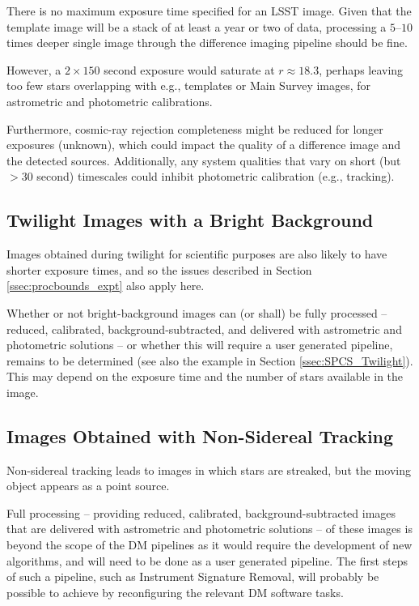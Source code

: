 There is no maximum exposure time specified for an LSST image.
Given that the template image will be a stack of at least a year or two of data, 
processing a $5$--$10$ times deeper single image through the difference imaging pipeline 
should be fine.

However, a $2\times150$ second exposure would saturate at $r \approx 18.3$, perhaps 
leaving too few stars overlapping with e.g., templates or Main Survey images, for astrometric and 
photometric calibrations.

Furthermore, cosmic-ray rejection completeness might be reduced for longer exposures 
(unknown), which could impact the quality of a difference image and the detected sources. 
Additionally, any system qualities that vary on short (but $>30$ second) timescales could 
inhibit photometric calibration (e.g., tracking).

\subsection{Twilight Images with a Bright Background}

Images obtained during twilight for scientific purposes are also likely to have shorter 
exposure times, and so the issues described in Section \ref{ssec:procbounds_expt} also 
apply here.

Whether or not bright-background images can (or shall) be fully processed -- reduced, 
calibrated, background-subtracted, and delivered with astrometric and photometric 
solutions -- or whether this will require a user generated pipeline, remains to be 
determined (see also the example in Section \ref{ssec:SPCS_Twilight}). 
This may depend on the exposure time and the number of stars available in the image.

\subsection{Images Obtained with Non-Sidereal Tracking}

Non-sidereal tracking leads to images in which stars are streaked, but the moving object 
appears as a point source.

Full processing -- providing reduced, calibrated, background-subtracted images that are 
delivered with astrometric and photometric solutions -- of these images is beyond the 
scope of the DM pipelines as it would require the development of new algorithms, and will 
need to be done as a user generated pipeline. 
The first steps of such a pipeline, such as Instrument Signature Removal, will probably 
be possible to achieve by reconfiguring the relevant DM software tasks.
